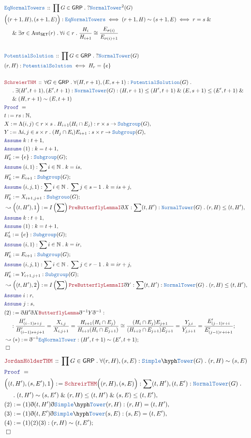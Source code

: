 \documentclass[12pt]{scrartcl}
\newcommand{\TYPE}[1]{\textcolor{NavyBlue}{\mathtt{#1}}}
\newcommand{\LOGIC}[1]{\textcolor{Blue}{\mathtt{#1}}}
\newcommand{\THM}[1]{\textcolor{Maroon}{\mathtt{#1}}}
\renewcommand{\.}{\; . \;}
\newcommand{\de}{: \kern 0.1pc =}
\newcommand{\Theorem}[2]{& \THM{#1} \, :: \, #2 \\ & \Proof = \\ }
\newcommand{\DeclareType}[2]{& \TYPE{#1} \, :: \, #2 \\}
\newcommand{\DefineType}[3]{& #1 : \TYPE{#2} \iff #3 \\}
\newcommand{\DefineNamedType}[4]{& #1 : \TYPE{#2} \iff #3 \iff #4 \\}
\newcommand{\NewLine}{\\ & \kern 1pc}
\newcommand{\Page}[1]{ \begin{align*} #1 \end{align*}   }
\newcommand{ \bd }{ \ByDef }
\renewcommand{\And}{\; \& \;}
\newcommand{\Nat}{\mathbb{N} }
\newcommand{\Say}[3]{& #1 \de #2 : #3, \\}
\newcommand{\Conclude}[3]{& #1 \de #2 : #3; \\}
\newcommand{\Derive}[3]{& \leadsto #1 \de #2 : #3, \\}
\newcommand{\DeriveConclude}[3]{& \leadsto #1 \de #2 : #3 ; \\}
\newcommand{\Assume}[2]{& \LOGIC{Assume} \; #1 : #2, \\}
\newcommand{\QED}{\; \square}
\newcommand{\EndProof}{& \QED \\}
\newcommand{\ByDef}{\eth}
\newcommand{\Proof}{\LOGIC{Proof} \; }
\newcommand{\SET}{\mathsf{SET}}
\newcommand{\GRP}{\mathsf{GRP}}
\begin{document}
\Page{
	\DeclareType{EqNormalTowers}{  \prod G \in \GRP \.  ?\TYPE{NormalTower}^2(G)  }
	\DefineNamedType{\Big((r + 1,H),(s+1,E)\Big)}{EqNormalTowers}{  (r+1,H) \sim (s +1, E)}
	{ r = s \And \NewLine \And  
	\exists \sigma \in \mathrm{Aut}_{\SET}(r) \. \forall i \in r \. \frac{H_i}{H_{i+1}} \cong 
	\frac{E_{\sigma(i)}}{E_{\sigma(i)+1} }   }
	\\
	\DeclareType{PotentialSolution}{\prod G \in \GRP \. ?\TYPE{NormalTower}(G)}
	\DefineType{(r,H)}{PotentialSolution}{H_{r} = \{e\}}
	\\
	\Theorem{SchreierTHM}{\forall G \in \GRP \. \forall (H,r + 1),(E,s + 1) : \TYPE{PotentialSolution}(G) \. 
		\NewLine \. \exists (H',t + 1), (E',t + 1) : \TYPE{NormalTower}(G) : 
		(H,r + 1) \le (H',t + 1) \And (E, s + 1) \le (E', t + 1) \And 
		\NewLine \And (H,r + 1) \sim (E,t + 1)
	}
	\Say{t}{rs}{\Nat}
	\Say{X}{\Lambda (i,j) \in  r \times s \.  H_{i+1}(H_i \cap E_j) }
	{  r \times s \to \TYPE{Subgroup}(G)}
	\Say{Y}{\Lambda i, j \in s \times r \.   (H_j \cap E_i) E_{i + 1}  }
	{ s \times r \to \TYPE{Subgroup}(G)}
	\Assume{k}{t + 1}
	\Assume{(1)}{k = t + 1}
	\Conclude{H'_k}{\{e\}}{\TYPE{Subgroup}(G)}
	\Assume{(i,1)}{ \sum i \in \Nat \.  k = is }
	\Conclude{H'_k}{ E_{i+1}}{\TYPE{Subgroup}(G)}
	\Assume{(i,j,1)}{\sum  i \in \Nat \. \sum j \in s-1 \. k = is + j}
	\Conclude{H'_k}{X_{i+1,j + 1} }{\TYPE{Subgrouo}(G)}
	\Derive{\Big( (t,H'), 1 \Big) }{ I\left(\sum \right)\THM{PreButterflyLemmaI}\bd X }
	{ \sum (t,H') : \TYPE{NormalTower}(G) \. (r,H) \le (t,H') }
	\Assume{k}{t + 1}
	\Assume{(1)}{k = t + 1}
	\Conclude{E'_k}{\{e\}}{\TYPE{Subgroup}(G)}
	\Assume{(i,1)}{ \sum i \in \Nat \.  k = ir }
	\Conclude{H'_k}{ E_{i+1}}{\TYPE{Subgroup}(G)}
	\Assume{(i,j,1)}{\sum  i \in \Nat \. \sum j \in r-1 \. k = ir + j}
	\Conclude{H'_k}{Y_{i+1,j + 1} }{\TYPE{Subgroup}(G)}
	\Derive{\Big( (t,H'), 2 \Big) }{ I\left(\sum \right)\THM{PreButterflyLemmaII}\bd Y }
	{ \sum (t,H') : \TYPE{NormalTower}(G) \. (r,H) \le (t,H') }
	\Assume{i}{r}
	\Assume{j}{s}
	\Conclude{(2)}{ \bd H' \bd X \THM{ButterflyLemma} \bd^{-1} Y \bd^{-1}}
	{
	  \NewLine :	
	 \frac{H'_{(i-1)s +j}}{H'_{(i-1)s + j + 1}} = \frac{X_{i,j}}{X_{i,j+1}} = 
	 \frac{ H_{i + 1}( H_{i} \cap E_{j})}{H_{i + 1}(H_{i } \cap E_{j+ 1} ) } \cong
	 \frac{ (H_{i} \cap E_{j })E_{j + 1} }{(H_{i+2} \cap E_{j+1} )E_{j+ 1}} =  
	 \frac{Y_{j ,i }}{Y_{j , i+1}} = \frac{E'_{(j-1)r + i}}{E'_{(j-1)r + i + 1}} 
	}
	\DeriveConclude{(*)}{\bd^{-1}\TYPE{EqNormalTower} }{(H',t+1) \sim (E',t + 1)}
	\EndProof
}\Page{
	\Theorem{JordanH\ddot{o}lderTHM}{ \prod G \in \GRP \. \forall (r,H),(s,E) : \TYPE{Simple}\hyph\TYPE{Tower}(G)  
		\.  (r,H) \sim (s,E)
	}
	\Say{\Big((t,H'),(s,E'),1\Big)}{\THM{SchreirTHM}\Big( (r,H),(s,E)\Big)}
	{ \sum  (t,H'),(t,E') : \TYPE{NormalTower}(G) \. 
	   \NewLine \.
		(t,H') \sim (s,E')    
	   \And   (r,H) \le (t,H') \And (s,E) \le (t,E') 	
	}
	\Say{ (2) }{(1)\bd(t,H')\bd \TYPE{Simple}\hyph\TYPE{Tower}(r,H)}{(r,H) = (t,H')}
	\Say{ (3) }{(1)\bd(t,E')\bd \TYPE{Simple}\hyph\TYPE{Tower}(s,E)}{(s,E) = (t,E')}
	\Conclude{(4)}{ (1)(2)(3)}{(r,H) \sim (t,E')}
	\EndProof
}
\newpage
\end{document}
